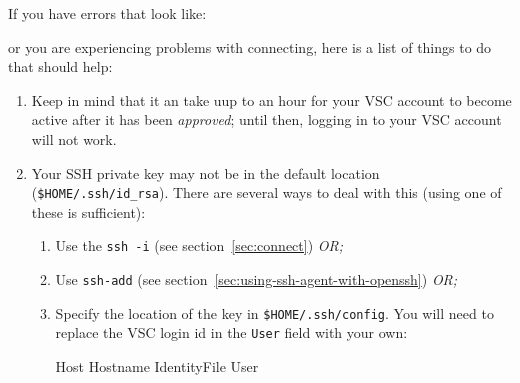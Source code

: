 If you have errors that look like:

\begin{prompt}
\end{prompt}

or you are experiencing problems with connecting, here is a list of things to do
that should help:

\begin{enumerate}
    \item Keep in mind that it an take uup to an hour for your VSC account to become
        active after it has been \emph{approved}; until then, logging in to your VSC
        account will not work.
\ifmacORlinux
    \item Your SSH private key may not be in the default location (\verb|$HOME/.ssh/id_rsa|).
        There are several ways to deal with this (using one of these is sufficient):
\begin{enumerate}
            \item Use the \verb|ssh -i| (see section~\ref{sec:connect}) \emph{OR;}
            \item Use \verb|ssh-add| (see section~\ref{sec:using-ssh-agent-with-openssh}) \emph{OR;}
            \item Specify the location of the key in \verb|$HOME/.ssh/config|. You will
                need to replace the VSC login id in the \verb|User| field with your own:

            \begin{prompt}
Host %
    Hostname %
    IdentityFile %
    User %


\end{prompt}
\end{enumerate}
\end{enumerate}

